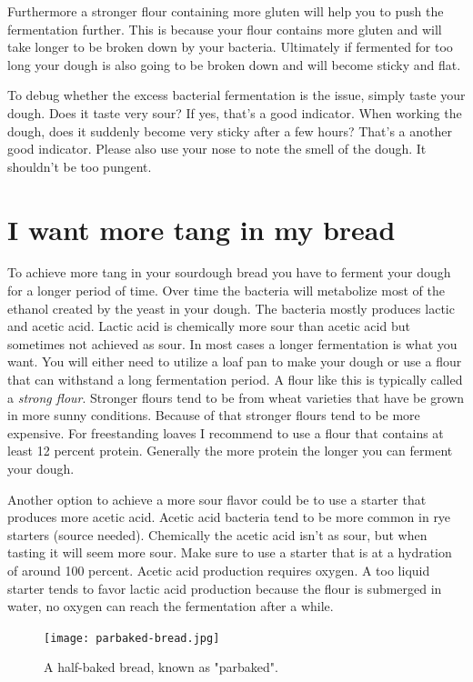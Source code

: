 Furthermore a stronger flour containing more gluten
will help you to push the fermentation further. This
is because your flour contains more gluten and will
take longer to be broken down by your bacteria. Ultimately
if fermented for too long your dough is also going
to be broken down and will become sticky and flat.

To debug whether the excess bacterial fermentation is the issue,
simply taste your dough. Does it taste very sour? If yes,
that's a good indicator. When working the dough, does it
suddenly become very sticky after a few hours? That's a
another good indicator. Please also use your nose to note
the smell of the dough. It shouldn't be too pungent.

\section{I want more tang in my bread}

To achieve more tang in your sourdough bread you have
to ferment your dough for a longer period of time.
Over time the bacteria will metabolize most of the
ethanol created by the yeast in your dough. The bacteria
mostly produces lactic and acetic acid. Lactic acid
is chemically more sour than acetic acid but sometimes
not achieved as sour. In most cases a longer fermentation
is what you want. You will either need to utilize a loaf
pan to make your dough or use a flour that can withstand
a long fermentation period. A flour like this is typically
called a {\it strong flour}. Stronger flours tend
to be from wheat varieties that have be grown in more
sunny conditions. Because of that stronger flours tend
to be more expensive. For freestanding loaves I recommend
to use a flour that contains at least 12 percent protein.
Generally the more protein the longer you can ferment your dough.

Another option to achieve a more sour flavor could be to
use a starter that produces more acetic acid. Acetic acid
bacteria tend to be more common in rye starters (source needed).
Chemically the acetic acid isn't as sour, but when tasting
it will seem more sour. Make sure to use a starter that is at
a hydration of around 100 percent. Acetic acid production
requires oxygen. A too liquid starter tends to favor lactic
acid production because the flour is submerged in water, no
oxygen can reach the fermentation after a while.

\begin{figure}[!htb]
  \texttt{[image: parbaked-bread.jpg]}
  \caption{A half-baked bread, known as "parbaked".}
  \label{fig:parbaked-bread}
\end{figure}


